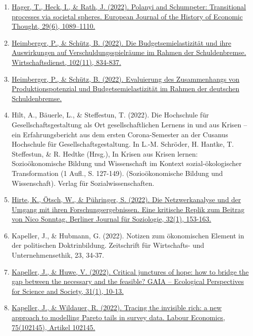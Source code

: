 \begin{enumerate}
	 \item \href{https://doi.org/10.1080/09672567.2022.2131865}{Hager, T., Heck, I., \& Rath, J. (2022). Polanyi and Schumpeter: Transitional processes via societal spheres. European Journal of the History of Economic Thought, 29(6), 1089–1110.}
	 \item \href{https://doi.org/10.1007/s10273-022-3325-y}{Heimberger, P., \& Schütz, B. (2022). Die Budgetsemielastizität und ihre Auswirkungen auf Verschuldungsspielräume im Rahmen der Schuldenbremse. Wirtschaftsdienst, 102(11), 834-837.}
	 \item \href{https://wiiw.ac.at/evaluierung-des-zusammenhangs-von-produktionspotenzial-und-budgetsemielastizitaet-im-rahmen-der-deutschen-schuldenbremse-dlp-6404.pdf}{Heimberger, P., \& Schütz, B. (2022). Evaluierung des Zusammenhangs von Produktionspotenzial und Budgetsemielastizität im Rahmen der deutschen Schuldenbremse.}
	 \item Hilt, A., Bäuerle, L., \& Steffestun, T. (2022). Die Hochschule für Gesellschaftsgestaltung als Ort gesellschaftlichen Lernens in und aus Krisen – ein Erfahrungsbericht aus dem ersten Corona-Semester an der Cusanus Hochschule für Gesellschaftsgestaltung. In L.-M. Schröder, H. Hantke, T. Steffestun, \& R. Hedtke (Hrsg.), In Krisen aus Krisen lernen: Sozioökonomische Bildung und Wissenschaft im Kontext sozial-ökologischer Transformation (1 Aufl., S. 127-149). (Sozioökonomische Bildung und Wissenschaft). Verlag für Sozialwissenschaften.
	 \item \href{https://doi.org/10.1007/s11609-022-00462-0}{Hirte, K., Ötsch, W., \& Pühringer, S. (2022). Die Netzwerkanalyse und der Umgang mit ihren Forschungsergebnissen. Eine kritische Replik zum Beitrag von Nico Sonntag. Berliner Journal für Soziologie, 32(1), 153-163.}
	 \item Kapeller, J., \& Hubmann, G. (2022). Notizen zum ökonomischen Element in der politischen Doktrinbildung. Zeitschrift für Wirtschafts- und Unternehmensethik, 23, 34-37.
	 \item \href{https://doi.org/10.14512/gaia.31.1.4}{Kapeller, J., \& Huwe, V. (2022). Critical junctures of hope: how to bridge the gap between the necessary and the feasible? GAIA -- Ecological Perspectives for Science and Society, 31(1), 10-13.}
	 \item \href{https://doi.org/10.1016/j.labeco.2022.102145}{Kapeller, J., \& Wildauer, R. (2022). Tracing the invisible rich: a new approach to modelling Pareto tails in survey data. Labour Economics, 75(102145), Artikel 102145.}

\end{enumerate}
